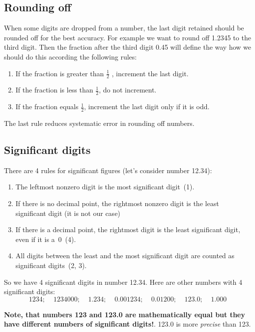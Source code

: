 \documentclass[12pt,a4paper]{article}
\begin{document}
\subsection{Rounding off}
When some digits are dropped from a number, the last digit retained should be rounded off for the best accuracy. For example we want to round off 1.2345 to the third digit. Then the fraction after the third digit 0.45 will define the way how we should do this according the following rules:
\begin{enumerate}
\item If the fraction is greater than $\frac{1}{2}$ , increment the last digit.
\item If the fraction is less than $\frac{1}{2}$, do not increment.
\item If the fraction equals $\frac{1}{2}$, increment the last digit only if it is odd.
\end{enumerate}

The last rule reduces systematic error in rounding off numbers.

\subsection{Significant digits}\label{sign_digits}
There are 4 rules for significant figures (let's consider number 12.34):
\begin{enumerate}
\item The leftmost nonzero digit is the most significant digit~(1).
\item If there is no decimal point, the rightmost nonzero digit is the least significant digit (it is not our case)
\item If there is a decimal point, the rightmost digit is the least significant digit, even if it is a~0~(4).
\item All digits between the least and the most significant digit are counted as significant digits~(2, 3).
\end{enumerate}
 So we have 4 significant digits in number 12.34. Here are other numbers with 4 significant digits:
 \begin{equation*}
 1234;\;\;\;\;1 234 000; \;\;\;\;1.234;\;\;\;\; 0.001234;\;\; \;\;0.01200;\;\;\;\; 123.0;\;\;\;\; 1.000
  \end{equation*}
  
\textbf{Note, that numbers 123 and 123.0 are mathematically equal but they have different numbers of significant digits!}. 123.0 is more \textit{precise} than 123.
\end{document}
